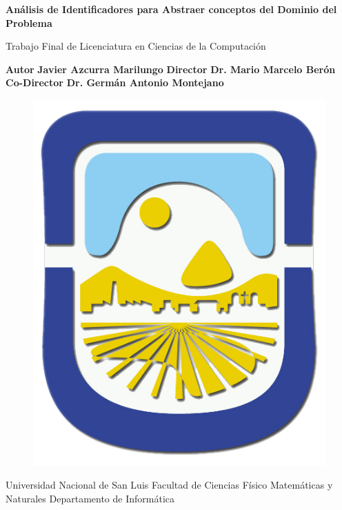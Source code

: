 \enlargethispage{\baselineskip}%
\enlargethispage{\baselineskip}

\begin{titlepage}
    \centering
    \vfill
    {\bfseries\huge         
	Análisis de Identificadores para Abstraer conceptos del	Dominio del Problema
     \vskip1.3cm       
   }  
   
{\bfseries\Large

Trabajo Final de Licenciatura en Ciencias de la Computación
\vskip0.7cm
}

 {\bfseries\large
	Autor
	\vskip0.1cm   
   }
   {\bfseries\Large
Javier Azcurra Marilungo
   \vskip1cm
   }
   {\bfseries\large
	Director
	\vskip0.1cm   
   }
   {\bfseries\Large
Dr. Mario Marcelo Berón
   \vskip1cm
   }
   {\bfseries\large
	Co-Director
	\vskip0.1cm   
   }
   {\bfseries\Large
Dr. Germán Antonio Montejano
   \vskip0.7cm
   }
   
{\bfseries\large

\begin{figure}[h!]
\centerline{%
\includegraphics[scale= 0.1]{./init/unsl_logo.png}} 
\end{figure}  

Universidad Nacional de San Luis
\vskip0.5cm
Facultad de Ciencias Físico Matemáticas y Naturales
\vskip0.5cm
Departamento de Informática

}
\end{titlepage}
 
